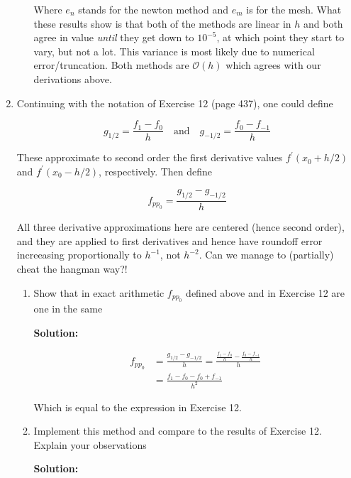 \documentclass[12pt]{article}
\newcommand{\BigO}[1]{\mathcal{O}\left( #1 \right)}
\begin{document}
\begin{enumerate}
\begin{enumerate}
Where $e_{n}$ stands for the newton method and $e_{m}$ is for the mesh. What these results show is that both of the methods are linear in $h$ and both agree in value {\em until} they get down to $10^{-5}$, at which point they start to vary, but not a lot. This variance is most likely due to numerical error/truncation. Both methods are $\BigO{h}$ which agrees with our derivations above.



\end{enumerate}

\item Continuing with the notation of Exercise 12 (page 437), one could define 

\[
	g_{1/2} = \frac{f_{1} - f_{0}}{h}\quad \text{and}\quad g_{-1/2}=\frac{f_{0} - f_{-1}}{h}
\]

These approximate to second order the first derivative values $f^{\prime}(x_{0} + h/2)$ and $f^{\prime}(x_{0} - h/2)$, respectively. Then define

\[
	f_{pp_{0}} = \frac{g_{1/2} - g_{-1/2}}{h}
\]

All three derivative approximations here are centered (hence second order), and they are applied to first derivatives and hence have roundoff error increeasing proportionally to $h^{-1}$, not $h^{-2}$. Can we manage to (partially) cheat the hangman way?!

\begin{enumerate}
\item Show that in exact arithmetic $f_{pp_{0}}$ defined above and in Exercise 12 are one in the same

{\bf Solution:}

\begin{align*}
f_{pp_{0}} &= \frac{g_{1/2} - g_{-1/2}}{h} = \frac{\frac{f_{1} - f_{0}}{h} - \frac{f_{0} - f_{-1}}{h}}{h}\\
             &= \frac{f_{1} - f_{0} - f_{0} + f_{-1}}{h^{2}}
\end{align*}

Which is equal to the expression in Exercise 12.

\item Implement this method and compare to the results of Exercise 12. Explain your observations

{\bf Solution:}


\end{enumerate}
\end{enumerate}
\end{document}
